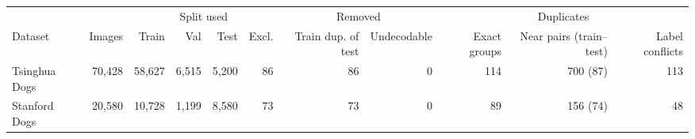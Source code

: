 \begin{tabular}{lrrrrrrrrrr}
\toprule
 & & \multicolumn{4}{c}{Split used} & \multicolumn{2}{c}{Removed} & \multicolumn{3}{c}{Duplicates} \\
\cmidrule(lr){3-6}\cmidrule(lr){7-8}\cmidrule(lr){9-11}
Dataset & Images & Train & Val & Test & Excl. & Train dup. of test & Undecodable & Exact groups & Near pairs (train--test) & Label conflicts \\
\midrule
Tsinghua Dogs & 70,428 & 58,627 & 6,515 & 5,200 & 86 & 86 & 0 & 114 & 700 (87) & 113 \\
Stanford Dogs & 20,580 & 10,728 & 1,199 & 8,580 & 73 & 73 & 0 & 89 & 156 (74) & 48 \\
\bottomrule
\end{tabular}
